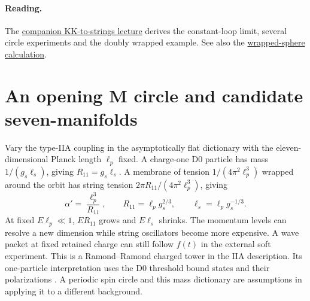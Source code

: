 \documentclass[10pt]{article}
\theoremstyle{definition}
\begin{document}
\paragraph{Reading.} The \href{https://github.com/arivero/conneskk/blob/master/paper/kk_strings_lecture.tex}{companion KK-to-strings lecture} derives the constant-loop limit, several circle experiments and the doubly wrapped example. See also the \href{https://github.com/arivero/conneskk/blob/master/results/86_wrapped_string_and_the_two_weak_roots.md}{wrapped-sphere calculation}.

\section{An opening M circle and candidate seven-manifolds}

Vary the type-IIA coupling in the asymptotically flat dictionary with the eleven-dimensional Planck length \(\ell_p\) fixed. A charge-one D0 particle has mass \(1/(g_s\ell_s)\), giving \(R_{11}=g_s\ell_s\). A membrane of tension \(1/(4\pi^2\ell_p^3)\) wrapped around the orbit has string tension \(2\pi R_{11}/(4\pi^2\ell_p^3)\), giving
\begin{equation}
 \alpha'=\frac{\ell_p^3}{R_{11}},\qquad
 R_{11}=\ell_p g_s^{2/3},\qquad
 \ell_s=\ell_p g_s^{-1/3}.
 \label{eq:summer-m-circle}
\end{equation}
At fixed \(E\ell_p\ll1\), \(ER_{11}\) grows and \(E\ell_s\) shrinks. The momentum levels can resolve a new dimension while string oscillators become more expensive. A wave packet at fixed retained charge can still follow \(f(t)\) in the external soft experiment. This is a Ramond--Ramond charged tower in the IIA description. Its one-particle interpretation uses the D0 threshold bound states and their polarizations \cite{DHIS1987,Witten1995Circle}. A periodic spin circle and this mass dictionary are assumptions in applying it to a different background.
\end{document}
